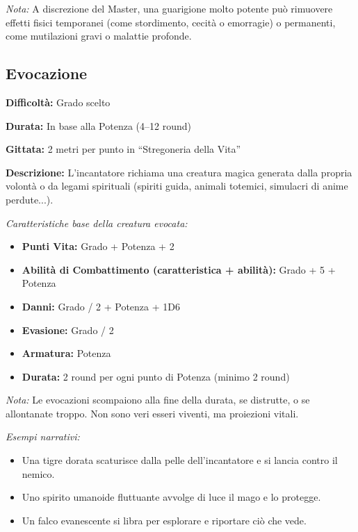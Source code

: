 \documentclass[./magie.tex]{subfiles}
\begin{document}
\textit{Nota:} A discrezione del Master, una guarigione molto potente può rimuovere effetti fisici temporanei (come stordimento, cecità o emorragie) o permanenti, come mutilazioni gravi o malattie profonde.

\clearpage
\subsection*{Evocazione}
\begin{description}
\item \textbf{Difficoltà:} Grado scelto
\item \textbf{Durata:} In base alla Potenza (4–12 round)
\item \textbf{Gittata:} 2 metri per punto in “Stregoneria della Vita”
\item \textbf{Descrizione:} L’incantatore richiama una creatura magica generata dalla propria volontà o da legami spirituali (spiriti guida, animali totemici, simulacri di anime perdute...).
\end{description}

\textit{Caratteristiche base della creatura evocata:}
\begin{itemize}
\item \textbf{Punti Vita:} Grado + Potenza + 2
\item \textbf{Abilità di Combattimento (caratteristica + abilità):} Grado + 5 + Potenza
\item \textbf{Danni:} Grado / 2 + Potenza + 1D6
\item \textbf{Evasione:} Grado / 2
\item \textbf{Armatura:} Potenza
\item \textbf{Durata:} 2 round per ogni punto di Potenza (minimo 2 round)
\end{itemize}

\textit{Nota:} Le evocazioni scompaiono alla fine della durata, se distrutte, o se allontanate troppo. Non sono veri esseri viventi, ma proiezioni vitali.

\textit{Esempi narrativi:}
\begin{itemize}
\item Una tigre dorata scaturisce dalla pelle dell’incantatore e si lancia contro il nemico.
\item Uno spirito umanoide fluttuante avvolge di luce il mago e lo protegge.
\item Un falco evanescente si libra per esplorare e riportare ciò che vede.
\end{itemize}
\end{document}
